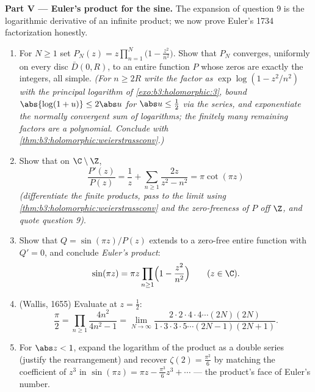 \begin{problem}
\medskip
\noindent\textbf{Part V --- Euler's product for the sine.}
The expansion of question 9 is the logarithmic derivative of
an infinite product; we now prove Euler's 1734 factorization
honestly.
\begin{enumerate}[resume]
  \item For $N \geq 1$ set $P_N(z) =
        z\prod_{n=1}^{N}\bigl(1 - \frac{z^2}{n^2}\bigr)$.
        Show that $P_N$ converges, uniformly on every disc
        $\bar D(0, R)$, to an entire function $P$ whose zeros
        are exactly the integers, all simple. \emph{(For $n
        \geq 2R$ write the factor as $\exp\log(1 -
        z^2/n^2)$ with the principal logarithm of
        \cref{exo:b3:holomorphic:3}, bound $\abs{\log(1+u)}
        \leq 2\abs u$ for $\abs u \leq \frac12$ via the
        series, and exponentiate the normally convergent sum
        of logarithms; the finitely many remaining factors
        are a polynomial. Conclude with
        \cref{thm:b3:holomorphic:weierstrassconv}.)}
  \item Show that on $\C\setminus\Z$,
        \[
        \frac{P'(z)}{P(z)} = \frac1z +
        \sum_{n\geq1}\frac{2z}{z^2 - n^2} = \pi\cot(\pi z)
        \]
        \emph{(differentiate the finite products, pass to
        the limit using
        \cref{thm:b3:holomorphic:weierstrassconv} and the
        zero-freeness of $P$ off $\Z$, and quote question
        9)}.
  \item Show that $Q = \sin(\pi z)/P(z)$ extends to a
        zero-free entire function with $Q' = 0$, and
        conclude \emph{Euler's product}:
        \[
        \sin(\pi z) = \pi z\prod_{n\geq1}
        \Bigl(1 - \frac{z^2}{n^2}\Bigr)
        \qquad (z \in \C) .
        \]
  \item (Wallis, 1655) Evaluate at $z = \frac12$:
        \[
        \frac\pi2 = \prod_{n\geq1}\frac{4n^2}{4n^2 - 1}
        = \lim_{N\to\infty}
        \frac{2\cdot2\cdot4\cdot4\cdots(2N)(2N)}
        {1\cdot3\cdot3\cdot5\cdots(2N-1)(2N+1)} .
        \]
  \item For $\abs z < 1$, expand the logarithm of the
        product as a double series (justify the
        rearrangement) and recover $\zeta(2) =
        \frac{\pi^2}6$ by matching the coefficient of $z^3$
        in $\sin(\pi z) = \pi z - \frac{\pi^3}6z^3 + \cdots$
        --- the product's face of Euler's number.
\end{enumerate}


\end{problem}
